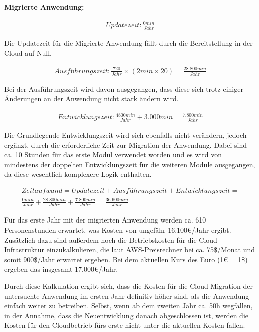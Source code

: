 \textbf{Migrierte Anwendung:}

\begin{align}
    Updatezeit: \frac{0min}{Jahr}
\end{align}

Die Updatezeit für die Migrierte Anwendung fällt durch die Bereitstellung in der Cloud auf Null.

\begin{align}
    Ausführungszeit: \frac{720}{Jahr} \times \left(2min \times 20\right)  = \frac{28.800min}{Jahr}
\end{align}

Bei der Ausführungszeit wird davon ausgegangen, dass diese sich trotz einiger Änderungen an der Anwendung nicht stark ändern wird.

\begin{align}
    Entwicklungszeit: \frac{4800min}{Jahr} + 3.000min = \frac{7.800min}{Jahr}
\end{align}

Die Grundlegende Entwicklungszeit wird sich ebenfalls nicht verändern, jedoch ergänzt, durch die erforderliche Zeit zur Migration der Anwendung. Dabei sind ca. 10 Stunden für das erste Modul verwendet worden und es wird von mindestens der doppelten Entwicklungszeit für die weiteren Module ausgegangen, da diese wesentlich komplexere Logik enthalten.

\begin{align}
    Zeitaufwand = Updatezeit + Ausführungszeit + Entwicklungszeit = \\
    \frac{0min}{Jahr} + \frac{28.800min}{Jahr} + \frac{7.800min}{Jahr} = \frac{36.600min}{Jahr}
\end{align}

Für das erste Jahr mit der migrierten Anwendung werden ca. 610 Personenstunden erwartet, was Kosten von ungefähr 16.100€/Jahr ergibt. Zusätzlich dazu sind außerdem noch die Betriebskosten für die Cloud Infrastruktur einzukalkulieren, die laut \ac{AWS}-Preisrechner bei ca. 75\$/Monat und somit 900\$/Jahr erwartet ergeben. Bei dem aktuellen Kurs des Euro (1€ = 1\$) ergeben das insgesamt 17.000€/Jahr.

Durch diese Kalkulation ergibt sich, dass die Kosten für die Cloud Migration der untersuchte Anwendung im ersten Jahr definitiv höher sind, als die Anwendung einfach weiter zu betreiben. Selbst, wenn ab dem zweiten Jahr ca. 50h wegfallen, in der Annahme, dass die Neuentwicklung danach abgeschlossen ist, werden die Kosten für den Cloudbetrieb fürs erste nicht unter die aktuellen Kosten fallen.
\pagebreak

